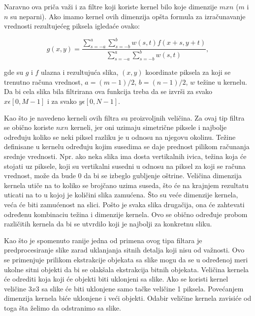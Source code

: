\documentclass[a4paper,12pt,titlepage]{article}
\begin{document}
Naravno ova priča važi i za filtre koji koriste kernel bilo koje dimenzije $m x n$ ($m$ i $n$ su neparni). Ako imamo kernel ovih dimenzija opšta formula za izračunavanje vrednosti rezultujećeg piksela igledaće ovako: 

\begin{equation}\label{eq:smoot1}
g(x, y) = \dfrac{\sum_{s = -a}^{a} \sum_{s = -b}^{b} w(s, t)f(x + s, y + t)}{\sum_{s = -a}^{a} \sum_{s = -b}^{b} w(s, t)},  
\end{equation}

gde su $g$ i $f$ ulazna i rezultujuća slika, $(x, y)$ koordinate piksela za koji se trenutno računa vrednost, $a = (m - 1) / 2$, $b = (n - 1) / 2$, $w$ težine u kernelu. Da bi cela slika bila filtrirana ova funkcija treba da se izvrši za svako $x \epsilon [0, M - 1]$ i za svako $y \epsilon [0, N - 1]$. 

Kao što je navedeno kerneli ovih filtra su proizvoljnih veličina. Za ovaj tip filtra se obično koriste $n x n$ kerneli, jer oni uzimaju simetrične piksele i najbolje određuju koliko se neki piksel razliku je u odnosu na njegovu okolinu. Težine definisane u kernelu određuju kojim susedima se daje prednost pilikom računanja srednje vrednosti. Npr. ako neka slika ima dosta vertikalnih ivica, težina koja će stojati uz piksele, koji su vertikalni susedni u odnosu na piksel za koji se računa vrednost, može da bude 0 da bi se izbeglo gubljenje oštrine. Veličina dimenzija kernela utiče na to koliko se brojčano uzima suseda, što će na krajnjem rezultatu uticati na to u kojoj je količini slika zamućena. Što su veće dimenzije kernela, veća će biti zamućenost na slici. Pošto je svaka slika drugačija, ona će zahtevati određenu kombinaciu težina i dimenzije kernela. Ovo se obično određuje probom različitih kernela da bi se utvrdilo koji je najbolji za konkretnu sliku. 

Kao što je spomenuto ranije jedna od primena ovog tipa filtara je predprocesiranje slike zarad uklanjanja sitnih detalja koji nisu od važnosti. Ovo se primenjuje prilikom ekstrakcije objekata sa slike mogu da se u određenoj meri ukolne sitni objekti da bi se olakšala ekstrakcija bitnih objekata. Veličina kernela će odrediti koja koji će objekti biti uklonjeni sa slike. Ako se koristi kernel veličine $3 x 3$ sa slike će biti uklonjene samo tačke veličine 1 piksela. Povećanjem dimenzija kernela biće uklonjene i veći objekti. Odabir veličine kernela zavisiće od toga šta želimo da odstranimo sa slike.
\end{document}
